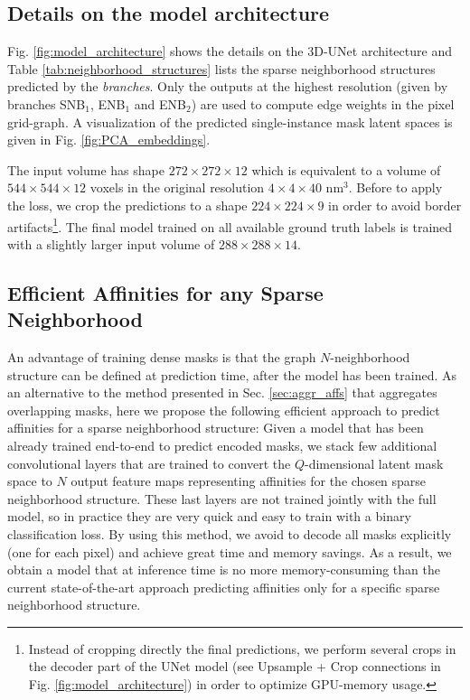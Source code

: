 \subsection{Details on the model architecture}\label{sec:arch_details_suppl}
Fig. \ref{fig:model_architecture} shows the details on the 3D-UNet architecture and Table \ref{tab:neighborhood_structures} lists the sparse neighborhood structures predicted by the \emph{\sparseBr branches}. Only the outputs at the highest resolution (given by branches SNB$_1$, ENB$_1$ and ENB$_2$) are used to compute edge weights in the pixel grid-graph. A visualization of the predicted single-instance mask latent spaces is given in Fig. \ref{fig:PCA_embeddings}.

The input volume has shape $272 \times 272\times12$ which is equivalent to a volume of $544\times 544\times 12$ voxels in the original resolution $4\times 4\times 40$ nm$^3$. Before to apply the loss, we crop the predictions to a shape $224\times 224\times 9$ in order to avoid border artifacts\footnote{Instead of cropping directly the final predictions, we perform several crops in the decoder part of the UNet model (see Upsample + Crop connections in Fig. \ref{fig:model_architecture}) in order to optimize GPU-memory usage.}.
The final model trained on all available ground truth labels is trained with a slightly larger input volume of $288\times 288\times 14$.


\subsection{Efficient Affinities for any Sparse Neighborhood}\label{sec:efficient_affs}
An advantage of training dense \maskname masks is that the graph $N$-neighborhood structure can be defined at prediction time, after the model has been trained. As an alternative to the method presented in Sec. \ref{sec:aggr_affs} that aggregates overlapping masks, here we propose the following efficient approach to predict affinities for a sparse neighborhood structure: Given a model that has been already trained end-to-end to predict encoded \maskname masks, we stack few additional convolutional layers that are trained to convert the $Q$-dimensional latent mask space to $N$ output feature maps representing affinities for the chosen sparse neighborhood structure. These last layers are not trained jointly with the full model, so in practice they are very quick and easy to train with a binary classification loss. By using this method, we avoid to decode all masks explicitly (one for each pixel) and achieve great time and memory savings.
As a result, we obtain a model that at inference time is no more memory-consuming than the current state-of-the-art approach predicting affinities only for a specific sparse neighborhood structure.


